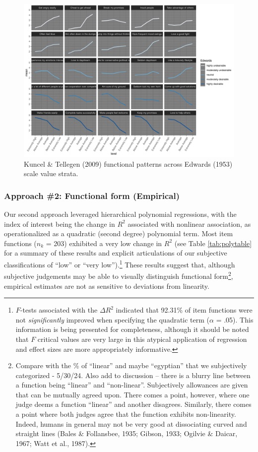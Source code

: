 \documentclass[
  ,jou]{apa6}
\begin{document}
\begin{figure}
\centering
\includegraphics{FullStudy_files/figure-latex/Figure2-1.pdf}
\caption{\label{fig:Figure2}Kuncel \& Tellegen (2009) functional patterns across Edwards (1953) scale value strata.}
\end{figure}

\subsubsection{Approach \#2: Functional form (Empirical)}\label{approach-2-functional-form-empirical}

Our second approach leveraged hierarchical polynomial regressions, with the index of interest being the change in \(R^2\) associated with nonlinear association, as operationalized as a quadratic (second degree) polynomial term. Most item functions (\(n_k\) = 203) exhibited a very low change in \(R^2\) (see Table \ref{tab:polytable} for a summary of these results and explicit articulations of our subjective classifications of ``low'' or ``very low'').\footnote{\(F\)-tests associated with the \(\Delta R^2\) indicated that 92.31\% of item functions were not \emph{significantly} improved when specifying the quadratic term (\(\alpha\) = .05). This information is being presented for completeness, although it should be noted that \(F\) critical values are very large in this atypical application of regression and effect sizes are more appropriately informative.} These results suggest that, although subjective judgements may be able to visually distinguish functional form\footnote{Compare with the \% of ``linear'' and maybe ``egyptian'' that we subjectively categorized - 5/30/24. Also add to discussion -- there is a blurry line between a function being ``linear'' and ``non-linear''. Subjectively allowances are given that can be mutually agreed upon. There comes a point, however, where one judge deems a function ``linear'' and another disagrees. Similarly, there comes a point where both judges agree that the function exhibits non-linearity. Indeed, humans in general may not be very good at dissociating curved and straight lines (Bales \& Follansbee, 1935; Gibson, 1933; Ogilvie \& Daicar, 1967; Watt et al., 1987).}, empirical estimates are not as sensitive to deviations from linearity.
\end{document}
